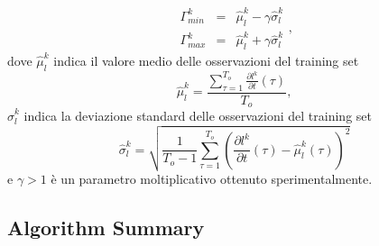 \documentclass{llncs}
\begin{document}
\begin{equation}
\label{eq:soglieLuma}
\begin{array}{rcl}
\Gamma_{min}^k & = & \hat{\mu}_l^k -\gamma \hat{\sigma}_l^k\\
\Gamma_{max}^k & = & \hat{\mu}_l^k + \gamma \hat{\sigma}_l^k
\end{array},
\end{equation}
dove $\hat{\mu}_l^k$ indica il valore medio delle osservazioni del training set
\begin{equation}
\hat{\mu}_l^k = \frac{\sum_{\tau = 1}^{T_{o}} \frac{\partial l^k}{\partial t}(\tau)}{T_{o}}, \nonumber
\end{equation}
$\hat{\sigma}_l^k$ indica la deviazione standard delle osservazioni del training set
\begin{equation}
\hat{\sigma}_l^k  = \sqrt{\frac{1}{T_{o}-1}\sum_{\tau=1}^{T_{o}}\left(\frac{\partial l^k}{\partial t}(\tau) - \hat{\mu}_l^k(\tau)\right)^2} \nonumber
\end{equation}
e $\gamma>1$ \`e un parametro moltiplicativo ottenuto sperimentalmente.\\





\subsection{Algorithm Summary}\label{subsec:AlgorithmSummary}
\end{document}
